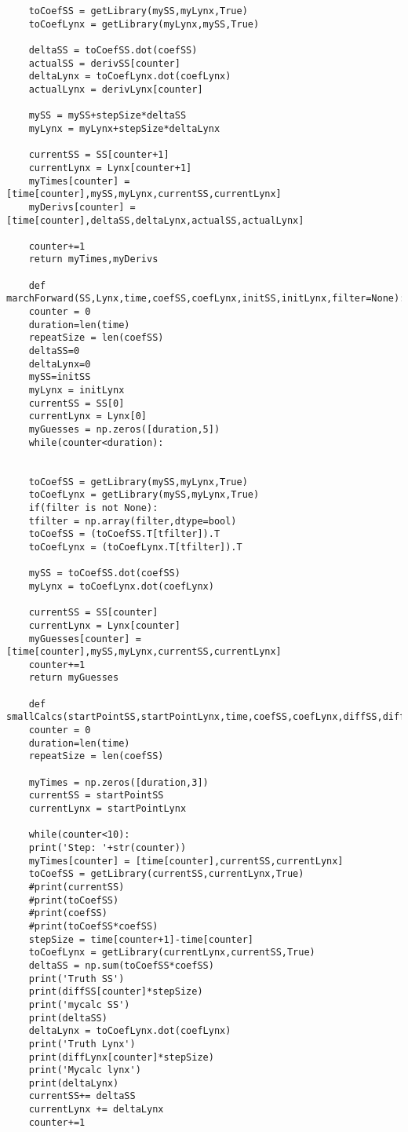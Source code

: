 \documentclass[12pt]{article}
\begin{document}
\begin{verbatim}
	toCoefSS = getLibrary(mySS,myLynx,True)
	toCoefLynx = getLibrary(myLynx,mySS,True)
	
	deltaSS = toCoefSS.dot(coefSS)
	actualSS = derivSS[counter]
	deltaLynx = toCoefLynx.dot(coefLynx)
	actualLynx = derivLynx[counter]
	
	mySS = mySS+stepSize*deltaSS
	myLynx = myLynx+stepSize*deltaLynx
	
	currentSS = SS[counter+1]
	currentLynx = Lynx[counter+1]
	myTimes[counter] = [time[counter],mySS,myLynx,currentSS,currentLynx]
	myDerivs[counter] = [time[counter],deltaSS,deltaLynx,actualSS,actualLynx]
	
	counter+=1
	return myTimes,myDerivs
	
	def marchForward(SS,Lynx,time,coefSS,coefLynx,initSS,initLynx,filter=None):
	counter = 0
	duration=len(time)
	repeatSize = len(coefSS)
	deltaSS=0
	deltaLynx=0
	mySS=initSS
	myLynx = initLynx
	currentSS = SS[0]
	currentLynx = Lynx[0]
	myGuesses = np.zeros([duration,5])
	while(counter<duration):
	
	
	toCoefSS = getLibrary(mySS,myLynx,True)
	toCoefLynx = getLibrary(mySS,myLynx,True)
	if(filter is not None):
	tfilter = np.array(filter,dtype=bool)
	toCoefSS = (toCoefSS.T[tfilter]).T
	toCoefLynx = (toCoefLynx.T[tfilter]).T
	
	mySS = toCoefSS.dot(coefSS)
	myLynx = toCoefLynx.dot(coefLynx)
	
	currentSS = SS[counter]
	currentLynx = Lynx[counter]
	myGuesses[counter] = [time[counter],mySS,myLynx,currentSS,currentLynx]
	counter+=1
	return myGuesses
	
	def smallCalcs(startPointSS,startPointLynx,time,coefSS,coefLynx,diffSS,diffLynx):
	counter = 0
	duration=len(time)
	repeatSize = len(coefSS)
	
	myTimes = np.zeros([duration,3])
	currentSS = startPointSS
	currentLynx = startPointLynx
	
	while(counter<10):
	print('Step: '+str(counter))
	myTimes[counter] = [time[counter],currentSS,currentLynx]
	toCoefSS = getLibrary(currentSS,currentLynx,True)
	#print(currentSS)
	#print(toCoefSS)
	#print(coefSS)
	#print(toCoefSS*coefSS)
	stepSize = time[counter+1]-time[counter]
	toCoefLynx = getLibrary(currentLynx,currentSS,True)
	deltaSS = np.sum(toCoefSS*coefSS)
	print('Truth SS')
	print(diffSS[counter]*stepSize)
	print('mycalc SS')
	print(deltaSS)
	deltaLynx = toCoefLynx.dot(coefLynx)
	print('Truth Lynx')
	print(diffLynx[counter]*stepSize)
	print('Mycalc lynx')
	print(deltaLynx)
	currentSS+= deltaSS
	currentLynx += deltaLynx
	counter+=1
	

\end{verbatim}
\end{document}
